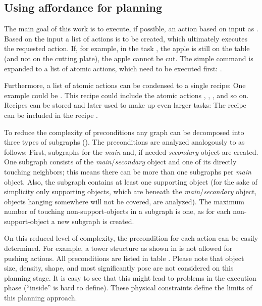\subsection{Using affordance for planning}
\label{ssec:action_methods_usingaffordanceforplanning}

The main goal of this work is to execute, if possible, an action based on input as .
Based on the input a list of actions is to be created, which ultimately executes the requested action.
If, for example, in the task , the apple is still on the table (and not on the cutting plate), the apple cannot be cut.
The simple command  is expanded to a list of atomic actions, which need to be executed first: .


Furthermore, a list of atomic actions can be condensed to a single recipe: One example could be .
This recipe could include the atomic actions , , , and so on.
Recipes can be stored and later used to make up even larger tasks: The recipe  can be included in the recipe .


To reduce the complexity of preconditions any graph can be decomposed into three types of subgraphs ().
The preconditions are analyzed analogously to  as follows: First, subgraphs for the \emph{main} and, if needed \emph{secondary} object are created.
One subgraph consists of the \emph{main}/\emph{secondary} object and one of its directly touching neighbors; this means there can be more than one subgraphs per \emph{main} object.
Also, the subgraph contains at least one supporting object (for the sake of simplicity only supporting objects, which are beneath the \emph{main}/\emph{secondary} object, \ie objects hanging somewhere will not be covered, are analyzed).
The maximum number of touching non-support-objects in a subgraph is one, as for each non-support-object a new subgraph is created.


On this reduced level of complexity, the precondition for each action can be easily determined.
For example, a tower structure as shown in  is not allowed for pushing actions.
All preconditions are listed in table .
Please note that object size, density, shape, and most significantly pose are not considered on this planning stage.
It is easy to see that this might lead to problems in the execution phase (\eg ``inside'' is hard to define).
These physical constraints define the limits of this planning approach.


